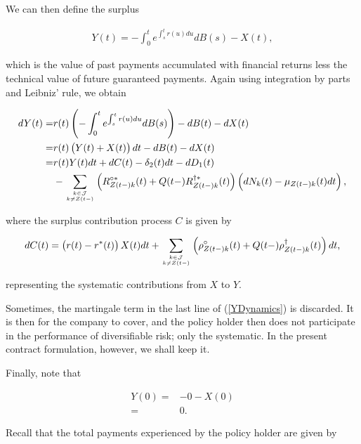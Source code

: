 \documentclass{article}
\newcommand{\1}[1]{\mathbbm{1}_{\left\lbrace #1 \right\rbrace}}
\theoremstyle{break}
\theoremstyle{remark}
\newenvironment{remark}
  {\pushQED{\qed}\renewcommand{\qedsymbol}{\scalebox{1.4}{$\circ$}}\remarkx}
  {\popQED\endremarkx}
\numberwithin{equation}{section}
\begin{document}
We can then define the surplus

\begin{align} \label{YDef}
Y(t) = - \int_0^t e^{\int_s^t r(u)du} dB(s) - X(t),
\end{align}

which is the value of past payments accumulated with financial returns less the technical value of future guaranteed payments. Again using integration by parts and Leibniz' rule, we obtain

\begin{align} \label{YDynamics}
\begin{split}
	dY(t) =& r(t) \left( - \int_0^t e^{\int_s^t r(u) du} dB(s) \right) - dB(t) - dX(t) \\
	=& r(t) \left( Y(t) + X(t) \right)dt - dB(t) - dX(t) \\
	=& r(t) Y(t) dt + dC(t) - \delta_2(t)dt - dD_1(t) \\
	&- \sum_{k \in \mathcal{J} \atop k \neq Z(t-)} \left( R_{Z(t-)k}^{\circ*}(t) + Q(t-) R_{Z(t-)k}^{\dagger*}(t) \right) \left( dN_k(t) - \mu_{Z(t-)k}(t) dt \right),
\end{split}
\end{align}

 where the surplus contribution process $C$ is given by

\begin{align*}
	dC(t) = \left( r(t) - r^*(t) \right) X(t) dt + \sum_{k \in \mathcal{J} \atop k \neq Z(t-)} \left( \rho_{Z(t-)k}^\circ(t) + Q(t-) \rho_{Z(t-)k}^\dagger(t) \right) dt,
\end{align*}

representing the systematic contributions from $X$ to $Y$.

\begin{remark}
	Sometimes, the martingale term in the last line of (\ref{YDynamics}) is discarded. It is then for the company to cover, and the policy holder then does not participate in the performance of diversifiable risk; only the systematic. In the present contract formulation, however, we shall keep it.
\end{remark}

Finally, note that

\begin{align*}
	Y(0) =& - 0 - X(0) \\
	=& 0.
\end{align*}

Recall that the total payments experienced by the policy holder are given by
\end{document}
